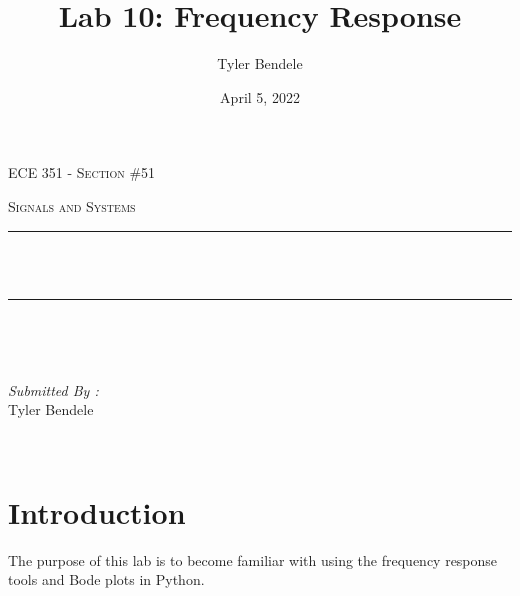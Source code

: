 \documentclass[12pt]{report}
\title{Lab 10: Frequency Response}
\author{Tyler Bendele}
\date{April 5, 2022}
\makeatletter
\let\thetitle\@title
\makeatother
\begin{document}
\begin{titlepage}
\centering
\vspace*{0.5 cm}

\begin{center}    \textsc{\Large   ECE 351 - Section \#51 }\\[2.0 cm]
\end{center}%
\textsc{\Large Signals and Systems  }\\[0.5 cm] %

\rule{\linewidth}{0.2 mm} \\[0.4 cm]
{ \huge \bfseries \thetitle}\\
\rule{\linewidth}{0.2 mm} \\[1.5 cm]
\begin{minipage}{0.4\textwidth}
\begin{flushleft} \large
\end{flushleft}
\end{minipage}~
\begin{minipage}{0.4\textwidth}
\begin{flushright} \large
\emph{Submitted By :} \\
Tyler Bendele
\end{flushright}
\end{minipage}\\[2 cm]
\end{titlepage}
\tableofcontents
\pagebreak
\renewcommand{\thesection}{\arabic{section}}
\section{Introduction}
The purpose of this lab is to become familiar with using the frequency
response tools and Bode plots in Python.
\end{document}
